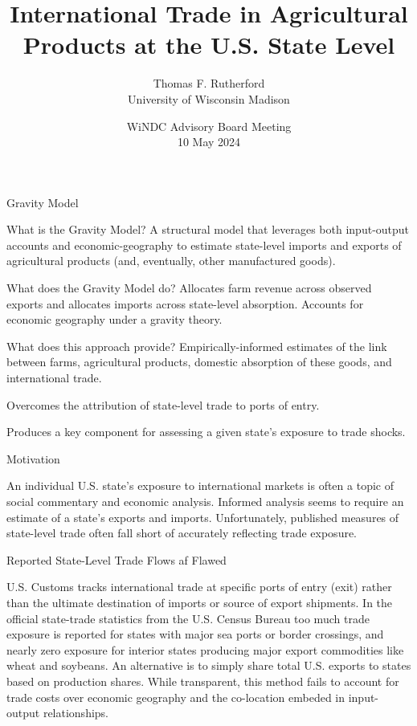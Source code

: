 \documentclass[10pt]{beamer}
\title{International Trade in Agricultural Products at the
{U.S.} State Level }
\author{Thomas F. Rutherford \\
University of Wisconsin Madison}
\date{WiNDC Advisory Board Meeting \\ 10 May 2024}
\begin{document}
\begin{frame}
  \titlepage
\end{frame}

\begin{frame}{Gravity Model}


\begin{block}{What is the Gravity Model?}
A structural model that leverages both input-output accounts and
economic-geography to estimate state-level imports and exports of
agricultural products (and, eventually, other manufactured goods). 
\end{block}

\begin{block}{What does the Gravity Model do?}
 Allocates farm revenue across observed exports and
allocates imports across state-level absorption. Accounts
for economic geography under a gravity theory. 
\end{block}

\begin{block}{What does this approach provide?}
 Empirically-informed estimates of the
link between farms, agricultural products, domestic absorption of
these goods, and international trade.
\vspace{.5cm}

Overcomes the attribution of state-level trade to ports of entry.

\vspace{.5cm}
 Produces a key component for assessing a given
state's exposure to trade shocks.
\end{block}

\end{frame}

\begin{frame}{Motivation}

An individual U.S. state's exposure to international markets is often
a topic of social commentary and economic analysis. Informed analysis
seems to require an estimate of a state's exports and imports.
Unfortunately, published measures of state-level trade often fall
short of accurately reflecting trade exposure. 

\end{frame}

\begin{frame}{Reported State-Level Trade Flows af Flawed}


U.S. Customs tracks international trade at specific ports of entry
(exit) rather than the ultimate destination of imports or source of
export shipments. In the official state-trade statistics from the U.S.
Census Bureau too much trade exposure is reported for states with
major sea ports or border crossings, and nearly zero exposure for
interior states producing major export commodities like wheat and
soybeans. An alternative is to simply share total U.S. exports to
states based on production shares. While transparent, this method
fails to account for trade costs over economic geography and the
co-location embeded in input-output relationships. 

\end{frame}
\end{document}
